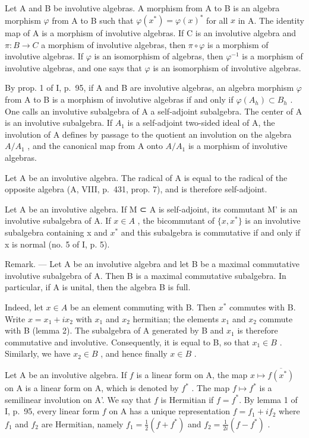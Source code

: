 Let A and B be involutive algebras. A morphism from A to B is an algebra morphism \(\varphi\) from A to B such that \(\varphi(x^{*}) = \varphi(x)^{*}\) for all \(x\) in A. The identity map of A is a morphism of involutive algebras. If C is an involutive algebra and \(\pi: B \to C\) a morphism of involutive algebras, then \(\pi \circ \varphi\) is a morphism of involutive algebras. If \(\varphi\) is an isomorphism of algebras, then \(\varphi^{-1}\) is a morphism of involutive algebras, and one says that \(\varphi\) is an isomorphism of involutive algebras.

By prop. 1 of I, p.~95, if A and B are involutive algebras, an algebra morphism \(\varphi\) from A to B is a morphism of involutive algebras if and only if \(\varphi(A_h) \subset B_h\) . One calls an involutive subalgebra of A a self-adjoint subalgebra. The center of A is an involutive subalgebra. If \(A_1\) is a self-adjoint two-sided ideal of A, the involution of A defines by passage to the quotient an involution on the algebra \(A/A_1\) , and the canonical map from A onto \(A/A_1\) is a morphism of involutive algebras.

Let A be an involutive algebra. The radical of A is equal to the radical of the opposite algebra (A, VIII, p.~431, prop. 7), and is therefore self-adjoint.

Let A be an involutive algebra. If M ⊂ A is self-adjoint, its commutant M' is an involutive subalgebra of A. If \(x \in A\) , the bicommutant of \(\{x, x^{*}\}\) is an involutive subalgebra containing x and \(x^{*}\) and this subalgebra is commutative if and only if x is normal (no. 5 of I, p. 5).

Remark. — Let A be an involutive algebra and let B be a maximal commutative involutive subalgebra of A. Then B is a maximal commutative subalgebra. In particular, if A is unital, then the algebra B is full.

Indeed, let \(x \in A\) be an element commuting with B. Then \(x^{*}\) commutes with B. Write \(x = x_{1} + ix_{2}\) with \(x_{1}\) and \(x_{2}\) hermitian; the elements \(x_{1}\) and \(x_{2}\) commute with B (lemma 2). The subalgebra of A generated by B and \(x_{1}\) is therefore commutative and involutive. Consequently, it is equal to B, so that \(x_{1} \in B\) . Similarly, we have \(x_{2} \in B\) , and hence finally \(x \in B\) .

Let A be an involutive algebra. If \(f\) is a linear form on A, the map \(x \mapsto \overline{f(x^*)}\) on A is a linear form on A, which is denoted by \(f^*\) . The map \(f \mapsto f^*\) is a semilinear involution on A'. We say that \(f\) is Hermitian if \(f = f^*\). By lemma 1 of I, p.~95, every linear form \(f\) on A has a unique representation \(f = f_1 + if_2\) where \(f_1\) and \(f_2\) are Hermitian, namely \(f_1 = \frac{1}{2}(f + f^*)\) and \(f_2 = \frac{1}{2i}(f - f^*)\) .

